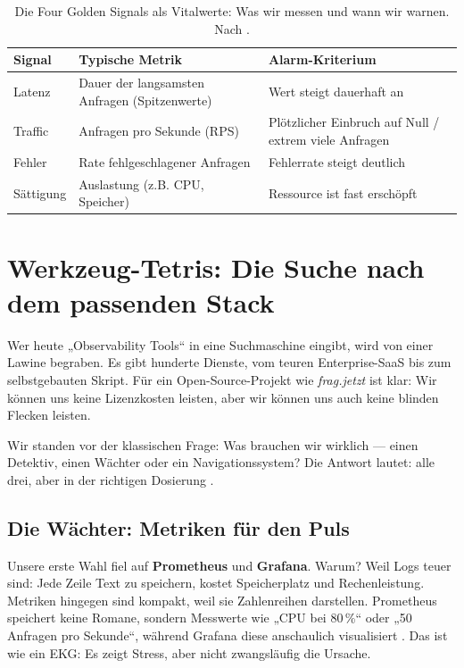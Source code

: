 \begin{table}[htb]
\centering
\small
\setlength{\tabcolsep}{4pt}
\renewcommand{\arraystretch}{1.3}
\begin{tabularx}{\columnwidth}{@{}l >{\RaggedRight\arraybackslash}X >{\RaggedRight\arraybackslash}X@{}}
\toprule
\textbf{Signal} & \textbf{Typische Metrik} & \textbf{Alarm-Kriterium} \\
\midrule
Latenz & Dauer der langsamsten Anfragen (Spitzenwerte) & Wert steigt dauerhaft an \\
Traffic & Anfragen pro Sekunde (RPS) & Plötzlicher Einbruch auf Null / extrem viele Anfragen \\
Fehler & Rate fehlgeschlagener Anfragen & Fehlerrate steigt deutlich \\
Sättigung & Auslastung (z.B. CPU, Speicher) & Ressource ist fast erschöpft \\
\bottomrule
\end{tabularx}
\caption{Die Four Golden Signals als Vitalwerte: Was wir messen und wann wir warnen. Nach \cite{ewaschukMonitoringDistributedSystems,sridharan2018distributed}.}
\label{tab:golden-signals-compact}
\end{table}

\section{Werkzeug-Tetris: Die Suche nach dem passenden Stack}

Wer heute „Observability Tools“ in eine Suchmaschine eingibt, wird von einer Lawine begraben. Es gibt hunderte Dienste, vom teuren Enterprise-SaaS bis zum selbstgebauten Skript. Für ein Open-Source-Projekt wie \emph{frag.jetzt} ist klar: Wir können uns keine Lizenzkosten leisten, aber wir können uns auch keine blinden Flecken leisten.

Wir standen vor der klassischen Frage: Was brauchen wir wirklich --- einen Detektiv, einen Wächter oder ein Navigationssystem? Die Antwort lautet: alle drei, aber in der richtigen Dosierung \cite{giamattei2024monitoring}.

\subsection{Die Wächter: Metriken für den Puls}

Unsere erste Wahl fiel auf \textbf{Prometheus} und \textbf{Grafana}. Warum? Weil Logs teuer sind: Jede Zeile Text zu speichern, kostet Speicherplatz und Rechenleistung. Metriken hingegen sind kompakt, weil sie Zahlenreihen darstellen. Prometheus speichert keine Romane, sondern Messwerte wie „CPU bei 80\,\%“ oder „50 Anfragen pro Sekunde“, während Grafana diese anschaulich visualisiert \cite{banerjee2024comparative}. Das ist wie ein EKG: Es zeigt Stress, aber nicht zwangsläufig die Ursache.

